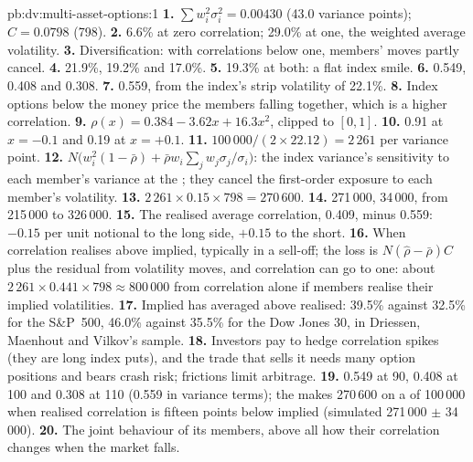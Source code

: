 \begin{solution}{pb:dv:multi-asset-options:1}
\textbf{1.} $\sum w_i^2\sigma_i^2=0.00430$ (43.0 variance points); $C=0.0798$ (798).
\textbf{2.} 6.6\% at zero correlation; 29.0\% at one, the weighted average volatility.
\textbf{3.} Diversification: with correlations below one, members' moves partly cancel.
\textbf{4.} 21.9\%, 19.2\% and 17.0\%.
\textbf{5.} 19.3\% at both: a flat index smile.
\textbf{6.} 0.549, 0.408 and 0.308.
\textbf{7.} 0.559, from the index's strip volatility of 22.1\%.
\textbf{8.} Index options below the money price the members falling together, which is a higher correlation.
\textbf{9.} $\rho(x)=0.384-3.62x+16.3x^2$, clipped to $[0,1]$.
\textbf{10.} 0.91 at $x=-0.1$ and 0.19 at $x=+0.1$.
\textbf{11.} $100\,000/(2\times22.12)=2\,261$ per variance point.
\textbf{12.} $N\bigl(w_i^2(1-\bar\rho)+\bar\rho w_i\sum_jw_j\sigma_j/\sigma_i\bigr)$: the index variance's sensitivity to each member's
variance at the ; they cancel the first-order exposure to each member's volatility.
\textbf{13.} $2\,261\times0.15\times798=270\,600$.
\textbf{14.} 271\,000, 34\,000, from 215\,000 to 326\,000.
\textbf{15.} The realised average correlation, 0.409, minus 0.559: $-0.15$ per unit notional to the long side, $+0.15$ to the
short.
\textbf{16.} When correlation realises above implied, typically in a sell-off; the loss is $N(\hat\rho-\bar\rho)C$ plus the
residual from volatility moves, and correlation can go to one: about $2\,261\times0.441\times798\approx800\,000$ from correlation
alone if members realise their implied volatilities.
\textbf{17.} Implied has averaged above realised: 39.5\% against 32.5\% for the S\&P~500, 46.0\% against 35.5\% for the Dow Jones 30,
in Driessen, Maenhout and Vilkov's sample.
\textbf{18.} Investors pay to hedge correlation spikes (they are long index puts), and the trade that sells it needs many option
positions and bears crash risk; frictions limit arbitrage.
\textbf{19.}  0.549 at 90, 0.408 at 100 and 0.308 at 110 (0.559 in variance terms); the  makes
270\,600 on a  of 100\,000 when realised correlation is fifteen points below implied (simulated 271\,000 $\pm$ 34\,000).
\textbf{20.} The joint behaviour of its members, above all how their correlation changes when the market falls.
\end{solution}

